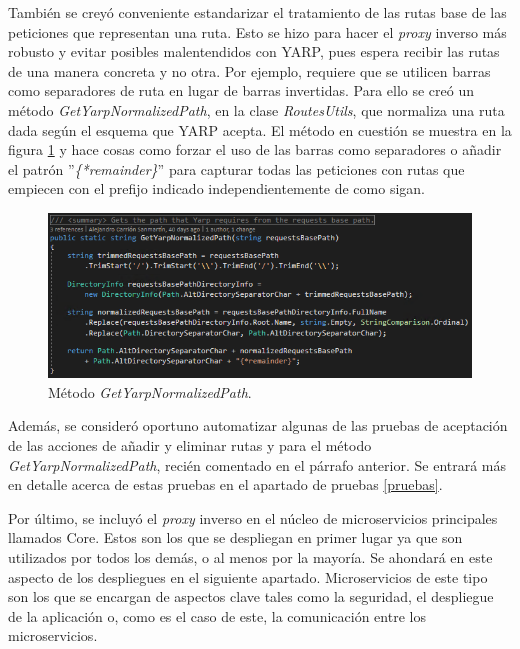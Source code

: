 \documentclass[11pt,spanish,listoffigures]{tfgetsinf}
\begin{document}
También se creyó conveniente estandarizar el tratamiento de las rutas base de las peticiones que representan una ruta. Esto se hizo para hacer el \emph{proxy} inverso más robusto y evitar posibles malentendidos con YARP, pues espera recibir las rutas de una manera concreta y no otra. Por ejemplo, requiere que se utilicen barras como separadores de ruta en lugar de barras invertidas. Para ello se creó un método \emph{GetYarpNormalizedPath}, en la clase \emph{RoutesUtils}, que normaliza una ruta dada según el esquema que YARP acepta. El método en cuestión se muestra en la figura \ref{getYarpNormalizedPath} y hace cosas como forzar el uso de las barras como separadores o añadir el patrón ''\emph{\{*remainder\}}'' para capturar todas las peticiones con rutas que empiecen con el prefijo indicado independientemente de como sigan.

\begin{figure}[ht]
\centering
\includegraphics[width=1\textwidth]{imagenes/getYarpNormalizedPath}
\caption{Método \emph{GetYarpNormalizedPath}.}
	\label{getYarpNormalizedPath}
\end{figure}

Además, se consideró oportuno automatizar algunas de las pruebas de aceptación de las acciones de añadir y eliminar rutas y para el método \emph{GetYarpNormalizedPath}, recién comentado en el párrafo anterior. Se entrará más en detalle acerca de estas pruebas en el apartado de pruebas \ref{pruebas}.

Por último, se incluyó el \emph{proxy} inverso en el núcleo de microservicios principales llamados Core. Estos son los que se despliegan en primer lugar ya que son utilizados por todos los demás, o al menos por la mayoría. Se ahondará en este aspecto de los despliegues en el siguiente apartado. Microservicios de este tipo son los que se encargan de aspectos clave tales como la seguridad, el despliegue de la aplicación o, como es el caso de este, la comunicación entre los microservicios.

\end{document}
